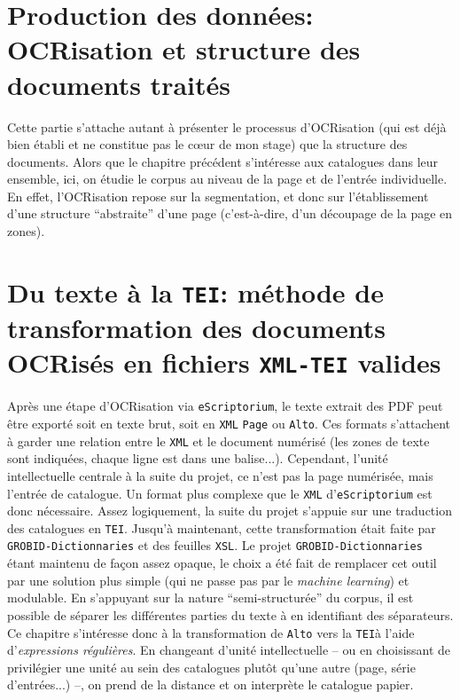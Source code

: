 \documentclass[a4paper, 12pt, twoside]{book}
\newcommand{\alto}{\texttt{Alto}}
\newcommand{\escr}{\texttt{eScriptorium}}
\newcommand{\rgx}{\textit{expressions régulières}}
\newcommand{\tei}{\texttt{TEI}}
\newcommand{\xml}{\texttt{XML}}
\newcommand{\xmltei}{\texttt{XML-TEI}}
\newcommand{\xsl}{\texttt{XSL}}
\begin{document}
\chapter{Production des données: OCRisation et structure des documents traités}
Cette partie s'attache autant à présenter le processus d'OCRisation (qui est déjà bien établi et ne constitue pas le cœur de mon stage) que la structure des documents. Alors que le chapitre précédent s'intéresse aux catalogues dans leur ensemble, ici, on étudie le corpus au niveau de la page et de l'entrée individuelle. En effet, l'OCRisation repose sur la segmentation, et donc sur l'établissement d'une structure \enquote{abstraite} d'une page (c'est-à-dire, d'un découpage de la page en zones).

\chapter{Du texte à la \tei{}: méthode de transformation des documents OCRisés en fichiers \xmltei{} valides}
\chaptermark{Du texte à la \tei{}}
Après une étape d'OCRisation via \escr{}, le texte extrait des PDF peut être exporté soit en texte brut, soit en \xml{} \texttt{Page} ou \alto{}. Ces formats s'attachent à garder une relation entre le \xml{} et le document numérisé (les zones de texte sont indiquées, chaque ligne est dans une balise...). Cependant, l'unité intellectuelle centrale à la suite du projet, ce n'est pas la page numérisée, mais l'entrée de catalogue. Un format plus complexe que le \xml{} d'\escr{} est donc nécessaire. Assez logiquement, la suite du projet s'appuie sur une traduction des catalogues en \tei{}. Jusqu'à maintenant, cette transformation était faite par \texttt{GROBID-Dictionnaries} et des feuilles \xsl{}. Le projet \texttt{GROBID-Dictionnaries} étant maintenu de façon assez opaque, le choix a été fait de remplacer cet outil par une solution plus simple (qui ne passe pas par le \textit{machine learning}) et modulable. En s'appuyant sur la nature \enquote{semi-structurée} du corpus, il est possible de séparer les différentes parties du texte à en identifiant des séparateurs. Ce chapitre s'intéresse donc à la transformation de \alto{} vers la \tei{}à l'aide d'\rgx{}. En changeant d'unité intellectuelle -- ou en choisissant de privilégier une unité au sein des catalogues plutôt qu'une autre (page, série d'entrées...) --, on prend de la distance et on interprète le catalogue papier.




\end{document}
